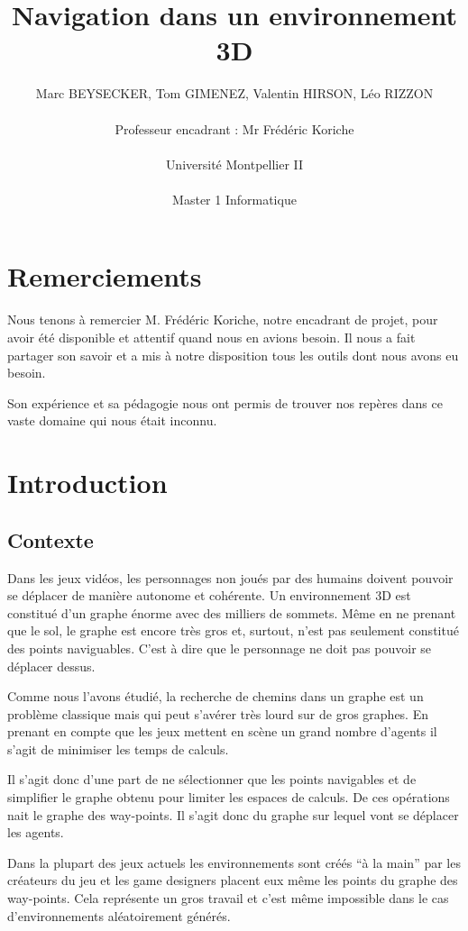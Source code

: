 \documentclass[a4paper,12pt]{report}
\title{Navigation dans un environnement 3D \vspace{0.5cm}}
\author{Marc BEYSECKER, Tom GIMENEZ, Valentin HIRSON, Léo RIZZON\\  \\Professeur encadrant : Mr Frédéric Koriche \\ \\Université Montpellier II \\  \\Master 1 Informatique}
\date{}
\begin{document}
\maketitle

\tableofcontents

\newpage

\chapter*{Remerciements}

Nous tenons à remercier M. Frédéric Koriche, notre encadrant de projet, pour avoir été disponible et attentif quand nous en avions besoin. Il nous a fait partager son savoir et a mis à notre disposition tous les outils dont nous avons eu besoin.

Son expérience et sa pédagogie nous ont permis de trouver nos repères dans ce vaste domaine qui nous était inconnu.

\chapter{Introduction}


\section*{Contexte}

Dans les jeux vidéos, les personnages non joués par des humains doivent pouvoir se déplacer de manière autonome et cohérente. Un environnement 3D est constitué d'un graphe énorme avec des milliers de sommets. Même en ne prenant que le sol, le graphe est encore très gros et, surtout, n'est pas seulement constitué des points naviguables. C'est à dire que le personnage ne doit pas pouvoir se déplacer dessus.

Comme nous l'avons étudié, la recherche de chemins dans un graphe est un problème classique mais qui peut s'avérer très lourd sur de gros graphes. En prenant en compte que les jeux mettent en scène un grand nombre d'agents il s'agit de minimiser les temps de calculs. 

Il s'agit donc d'une part de ne sélectionner que les points navigables et de simplifier le graphe obtenu pour limiter les espaces de calculs. De ces opérations nait le graphe des way-points. Il s'agit donc du graphe sur lequel vont se déplacer les agents.

Dans la plupart des jeux actuels les environnements sont créés ``à la main'' par les créateurs du jeu et les game designers placent eux même les points du graphe des way-points. Cela représente un gros travail et c'est même impossible dans le cas d'environnements aléatoirement générés.
\end{document}
